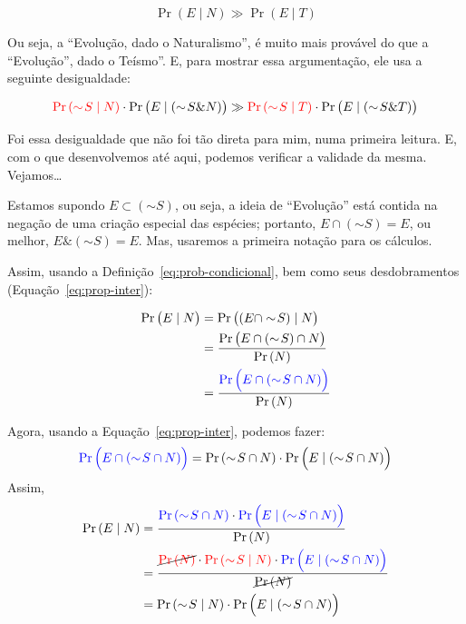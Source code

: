 \documentclass[12pt]{article}
\theoremstyle{definition}
\newcommand{\N}{\ensuremath{\sim\!}}
\begin{document}
		\begin{equation}\label{eq:argumento-draper}
		 \Pr{(E \mid N)} \gg \Pr{(E \mid T)}
		\end{equation}
		
		Ou seja, a ``Evolução, dado o Naturalismo'', é muito mais provável do que a 
		``Evolução'', dado o Teísmo''.
		E, para mostrar essa argumentação, ele usa a seguinte desigualdade:	
		
		\scriptsize
		\begin{equation} \label{eq:draper-logica}
		 \textcolor{red}{\Pr{(\N S \mid N)}} \cdot \Pr{\big(E \mid (\N S \& N)\big)}
		 \gg
		 \textcolor{red}{\Pr{(\N S \mid T)}} \cdot \Pr{\big(E \mid (\N S \& T)\big)}
		\end{equation}
		\normalsize
		
		Foi essa desigualdade que não foi tão direta para mim, numa primeira leitura.
		E, com o que desenvolvemos até aqui, podemos verificar a validade da mesma.
		Vejamos\ldots
		
		Estamos supondo $ E \subset (\N S) $, ou seja, a ideia de ``Evolução'' está
		contida na negação de uma criação especial das espécies; portanto, 
		$ E \cap (\N S) = E $, ou melhor, $ E \& (\N S) = E $.
		Mas, usaremos a primeira notação para os cálculos.
		
		Assim, usando a Definição~\ref{eq:prob-condicional}, bem como seus 
		desdobramentos (Equação~\ref{eq:prop-inter}):
		
		\footnotesize
		\begin{align*}
		 \Pr{\big(E \mid N\big)} &= \Pr{\big((E \cap \N S) \mid N \big)}\\
			&= \frac{\Pr{\big(E \cap (\N S) \cap N}\big)}{\Pr{(N)}}\\
			&= \frac{\textcolor{blue}{\Pr{\Big(E \cap (\N S \cap N)}\Big)}}{\Pr{(N)}} 
		\end{align*}
		\normalsize
		
		Agora, usando a Equação~\ref{eq:prop-inter}, podemos fazer:
		\footnotesize
		\[
		 \textcolor{blue}{\Pr{\Big(E \cap (\N S \cap N)}\Big)} = \Pr{(\N S \cap N)}\cdot \Pr{\Big(E \mid (\N S \cap N)\Big)}
		\]
		\normalsize
		Assim,
		\footnotesize
		\begin{align*}
		 \Pr{(E \mid N)} &= \frac{\textcolor{blue}{\Pr{(\N S \cap N)}} \cdot \textcolor{blue}{\Pr{\Big(E \mid (\N S \cap N)\Big)}}}{\Pr{(N)}}\\
			&= \frac{\cancel{\textcolor{red}{\Pr{(N)}}} \cdot \textcolor{red}{\Pr{(\N S \mid N)}}
				\cdot
				\textcolor{blue}{\Pr{\Big(E \mid (\N S \cap N)\Big)}}}{\cancel{\Pr{(N)}}}\\
			&= \Pr{(\N S \mid N)} \cdot \Pr{\Big(E \mid (\N S \cap N)\Big)}
		\end{align*}
		\normalsize
		
\end{document}
